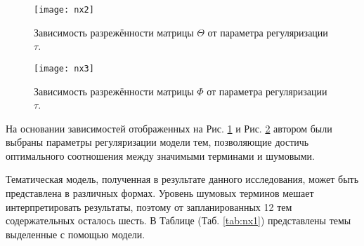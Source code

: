 \begin{figure}[H]
  \caption{Зависимость разрежённости матрицы $\Theta$ от параметра регуляризации $\tau$.}
  \centering
    \texttt{[image: nx2]}
  \label{fig:nx2}
\end{figure}  

\begin{figure}[H]
  \caption{Зависимость разрежённости матрицы $\Phi$ от параметра регуляризации $\tau$.}
  \centering
    \texttt{[image: nx3]}
  \label{fig:nx3}
\end{figure}  

На основании зависимостей отображенных на  Рис. \ref{fig:nx2}  и Рис. \ref{fig:nx3} автором были выбраны параметры регуляризации модели тем, позволяющие достичь оптимального соотношения между значимыми терминами и шумовыми.

Тематическая модель, полученная в результате данного исследования, может быть представлена в различных формах. Уровень шумовых терминов мешает интерпретировать результаты, поэтому от запланированных 12 тем содержательных осталось шесть. В Таблице (Таб. \ref{tab:nx1}) представлены темы выделенные с помощью модели. 

\begin{table}[H]
\centering
\caption{Фрагмент матрицы $\Phi$ для терминов  с максимальными вероятностями.}
\label{tab:nx1}
\end{table}

